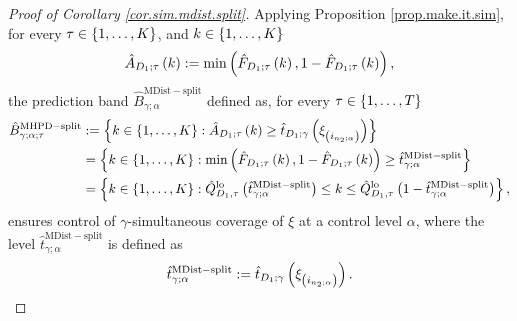 \documentclass[11pt]{article}
\begin{document}
\begin{proof}[Proof of Corollary \ref{cor.sim.mdist.split}]
Applying Proposition \ref{prop.make.it.sim},
for every $\tau \in \left\{ 1, \ldots, K \right\}$, and $k \in \left\{ 1, \ldots, K \right\}$
\begin{align}
\label{eq.sim.ecdf}
    \hat{A}_{D_1; \tau}\left( k \right)
    := \min\left( \hat{F}_{D_1; \tau} \left( k \right), 1 - \hat{F}_{D_1; \tau} \left( k \right) \right),
\end{align}
%
%
%
the prediction band $\hat{B}^{\mathrm{MDist-split}}_{\gamma; \alpha}$ defined as,
for every $\tau \in \left\{ 1, \ldots, T \right\}$
\begin{align*}
    \hat{B}_{\gamma; \alpha; \tau}^{\mathrm{MHPD-split}}
    &
    :=
    \left\{ 
        k \in \left\{ 1, \ldots, K \right\} :
        \hat{A}_{D_1; \tau} \left( k \right)
        \geq
        \hat{t}_{D_1; \gamma} \left( \xi_{\left( i_{n_2; \alpha} \right)} \right)
     \right\}
    \\
    &
    = \left\{ 
        k \in \left\{ 1, \ldots, K \right\} :
        \min \left( 
            \hat{F}_{D_1; \tau} \left( k \right),
            1 - \hat{F}_{D_1; \tau} \left( k \right)   
         \right)
        \geq \hat{t}_{\gamma; \alpha}^{\mathrm{MDist-split}}
     \right\}
    \\
    &
    =
    \left\{ 
        k \in \left\{ 1, \ldots, K \right\} :
        \hat{Q}_{D_1, \tau}^{\mathrm{lo}}
        \left( 
            \hat{t}_{\gamma; \alpha}^{\mathrm{MDist-split}}
         \right)
        \leq k
        \leq \hat{Q}_{D_1, \tau}^{\mathrm{lo}}
        \left( 
            1 - \hat{t}_{\gamma; \alpha}^{\mathrm{MDist-split}}
         \right)
     \right\},
\end{align*}
ensures control of $\gamma$-simultaneous coverage of $\xi$ at a control level $\alpha$,
where the level $\hat{t}_{\gamma; \alpha}^{\mathrm{MDist-split}}$ is defined as
\begin{align}
    \label{eq.threshold.sim.mdist.split}
    \hat{t}_{\gamma; \alpha}^{\mathrm{MDist-split}} :=
    \hat{t}_{D_1; \gamma} \left( \xi_{\left( i_{n_2; \alpha} \right)} \right).
\end{align}
\end{proof}





\printbibliography
%
%
%
\end{document}

